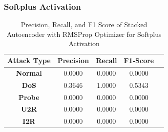 \documentclass[12pt, a4paper]{report}
\begin{document}
\subsubsection{Softplus Activation}
\begin{table}[ht]
\centering
\captionsetup{justification=centering,margin=2cm}
\begin{tabular}{|c|c|c|c|c|}
\hline
\multicolumn{1}{|c|}{\textbf{Attack Type}} & \multicolumn{1}{c|}{\textbf{Precision}} & \multicolumn{1}{c|}{\textbf{Recall}} & \multicolumn{1}{c|}{\textbf{F1-Score}} \\ \hline
\textbf{Normal}        & 0.0000                                   & 0.0000                                & 0.0000                                                                  \\ \hline
\textbf{DoS}           & 0.3646                                  & 1.0000                                &  0.5343                                                                    \\ \hline
\textbf{Probe}         & 0.0000                                  & 0.0000                                & 0.0000                                                                  \\ \hline
\textbf{U2R}           & 0.0000                                    & 0.0000                                & 0.0000                                                                   \\ \hline
\textbf{I2R}           & 0.0000                                      & 0.0000                                   & 0.0000                                                            \\ \hline         \end{tabular}
\caption{Precision, Recall, and F1 Score of Stacked Autoencoder with RMSProp Optimizer for Softplus Activation}
\label{prf1_rmsprop_elu_auto}
\end{table}
\end{document}
